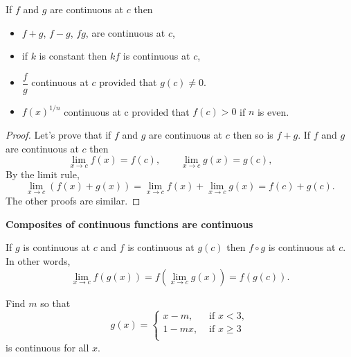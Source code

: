\documentclass[../main.tex]{subfiles}
\begin{document}
	\begin{theorem}
		If $f$ and $g$ are continuous at $c$ then
		\begin{itemize}
			\item $f + g$, $f - g$, $f g$, are continuous at $c$,
			\item if $k$ is constant then $k f$ is continuous at $c$,
			\item $\dfrac{f}{g}$ continuous at $c$ provided that $g(c) \neq 0$.
			\item $f(x)^{1/n}$ continuous at c provided that $f(c)>0$ if $n$ is even.
		\end{itemize}
	\end{theorem}

	\begin{proof}
		Let's prove that if $f$ and $g$ are continuous at $c$ then so is $f+g$. If $f$ and $g$ are continuous at $c$ then
		\[
			\lim_{x \to c} f(x) = f(c), \qquad
			\lim_{x \to c} g(x) = g(c), \qquad
		\]
		By the limit rule,
		\[
			\lim_{x \to c} (f(x) + g(x)) =
			\lim_{x \to c} f(x) + \lim_{x \to c} g(x) =
			f(c) + g(c).
		\]
		The other proofs are similar.
	\end{proof}
	\textbf{Composites of continuous functions are continuous}

	If $g$ is continuous at $c$ and $f$ is continuous at $g(c)$ then $f \circ g$ is continuous at $c$. In other words,
	\[
		\lim_{x \to c} f(g(x)) = f(\lim_{x \to c} g(x)) = f(g(c)).
	\]

	\begin{example}
		Find $m$ so that
		\[
			g(x) = \begin{cases}
			x-m, &\text{ if }x < 3,\\
			1-mx, &\text{ if }x \geq 3\\
		\end{cases}
	\]
	is continuous for all $x$.
\end{example}


\end{document}
